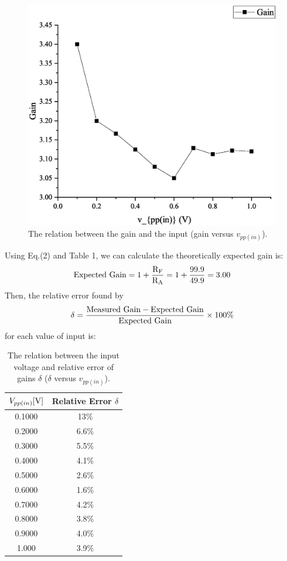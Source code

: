 \documentclass[a4paper]{report}
\begin{document}
	\begin{figure}[H]
		\centering
		\includegraphics[width=1\linewidth]{9.eps}
		\caption{The relation between the gain and the input (gain versus $v_{pp(in)}$).}
	\end{figure}
	Using Eq.(2) and Table 1, we can calculate the theoretically expected gain is:
	\begin{equation*}
	\rm{Expected\ Gain}=1+\dfrac{R_F}{R_A}=1+\dfrac{99.9}{49.9}=3.00
	\end{equation*}
	Then, the relative error found by
	\begin{equation*}
	\delta=\rm{\dfrac{Measured\ Gain-Expected\ Gain}{Expected\ Gain}}\times100\%
	\end{equation*}	
	for each value of input is:
	\begin{table}[H]
		\centering
		\begin{tabular}{|c|c|}
			\hline
			$V_{pp(in)}[\rm{V}]$&Relative Error $\delta$\\
			\hline
			0.1000&13\%\\
			\hline
			0.2000&6.6\%\\
			\hline
			0.3000&5.5\%\\
			\hline
			0.4000&4.1\%\\
			\hline
			0.5000&2.6\%\\
			\hline
			0.6000&1.6\%\\
			\hline
			0.7000&4.2\%\\
			\hline
			0.8000&3.8\%\\
			\hline
			0.9000&4.0\%\\
			\hline
			1.000&3.9\%\\
			\hline
		\end{tabular}
		\caption{The relation between the input voltage and relative error of gains $\delta$ ($\delta$ versus $v_{pp(in)}$).}
	\end{table}
\end{document}
